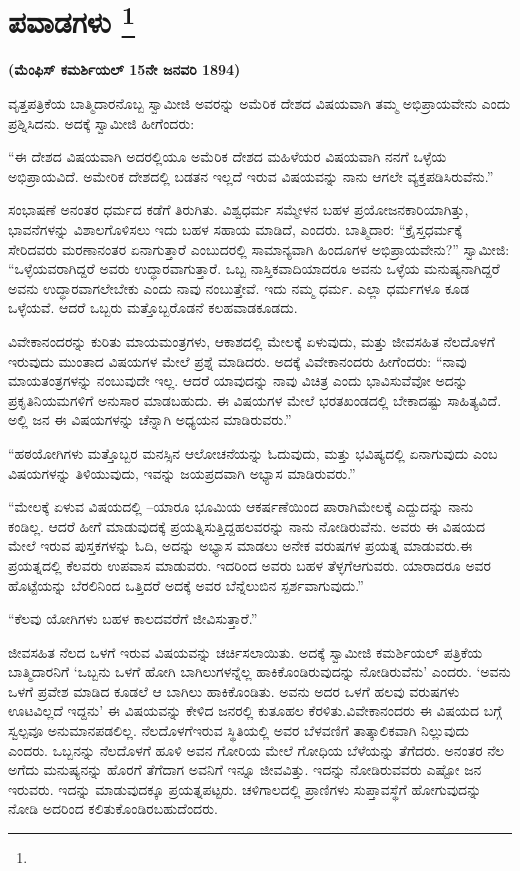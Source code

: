 
\chapter[ಪವಾಡಗಳು ]{ಪವಾಡಗಳು \protect\footnote{}}

\centerline{\textbf{(ಮೆಂಫಿಸ್​ ಕಮರ್ಶಿಯಲ್​ 15ನೇ ಜನವರಿ 1894)}}

ವೃತ್ತಪತ್ರಿಕೆಯ ಬಾತ್ಮಿದಾರನೊಬ್ಬ ಸ್ವಾಮೀಜಿ ಅವರನ್ನು ಅಮೆರಿಕ ದೇಶದ ವಿಷಯವಾಗಿ ತಮ್ಮ ಅಭಿಪ್ರಾಯವೇನು ಎಂದು ಪ್ರಶ್ನಿಸಿದನು. ಅದಕ್ಕೆ ಸ್ವಾಮೀಜಿ ಹೀಗೆಂದರು:

“ಈ ದೇಶದ ವಿಷಯವಾಗಿ ಅದರಲ್ಲಿಯೂ ಅಮೆರಿಕ ದೇಶದ ಮಹಿಳೆಯರ ವಿಷಯವಾಗಿ ನನಗೆ ಒಳ್ಳೆಯ ಅಭಿಪ್ರಾಯವಿದೆ. ಅಮೇರಿಕ ದೇಶದಲ್ಲಿ ಬಡತನ ಇಲ್ಲದೆ ಇರುವ ವಿಷಯವನ್ನು ನಾನು ಆಗಲೇ ವ್ಯಕ್ತಪಡಿಸಿರುವೆನು.”

ಸಂಭಾಷಣೆ ಅನಂತರ ಧರ್ಮದ ಕಡೆಗೆ ತಿರುಗಿತು. ವಿಶ್ವಧರ್ಮ ಸಮ್ಮೇಳನ ಬಹಳ ಪ್ರಯೋಜನಕಾರಿಯಾಗಿತ್ತು, ಭಾವನೆಗಳನ್ನು ವಿಶಾಲಗೊಳಿಸಲು ಇದು ಬಹಳ ಸಹಾಯ ಮಾಡಿದೆ, ಎಂದರು. ಬಾತ್ಮಿದಾರ: “ಕ್ರೈಸ್ತಧರ್ಮಕ್ಕೆ ಸೇರಿದವರು ಮರಣಾನಂತರ ಏನಾಗುತ್ತಾರೆ ಎಂಬುದರಲ್ಲಿ ಸಾಮಾನ್ಯವಾಗಿ ಹಿಂದೂಗಳ ಅಭಿಪ್ರಾಯವೇನು?” ಸ್ವಾಮೀಜಿ: “ಒಳ್ಳೆಯವರಾಗಿದ್ದರೆ ಅವರು ಉದ್ಧಾರವಾಗುತ್ತಾರೆ. ಒಬ್ಬ ನಾಸ್ತಿಕವಾದಿಯಾದರೂ ಅವನು ಒಳ್ಳೆಯ ಮನುಷ್ಯನಾಗಿದ್ದರೆ ಅವನು ಉದ್ಧಾರವಾಗಲೇಬೇಕು ಎಂದು ನಾವು ನಂಬುತ್ತೇವೆ. ಇದು ನಮ್ಮ ಧರ್ಮ. ಎಲ್ಲಾ ಧರ್ಮಗಳೂ ಕೂಡ ಒಳ್ಳೆಯವೆ. ಆದರೆ ಒಬ್ಬರು ಮತ್ತೊಬ್ಬರೊಡನೆ ಕಲಹವಾಡಕೂಡದು.

ವಿವೇಕಾನಂದರನ್ನು ಕುರಿತು ಮಾಯಮಂತ್ರಗಳು, ಆಕಾಶದಲ್ಲಿ ಮೇಲಕ್ಕೆ ಏಳುವುದು, ಮತ್ತು ಜೀವಸಹಿತ ನೆಲದೊಳಗೆ ಇರುವುದು ಮುಂತಾದ ವಿಷಯಗಳ ಮೇಲೆ ಪ್ರಶ್ನೆ ಮಾಡಿದರು. ಅದಕ್ಕೆ ವಿವೇಕಾನಂದರು ಹೀಗೆಂದರು: “ನಾವು ಮಾಯತಂತ್ರಗಳನ್ನು ನಂಬುವುದೇ ಇಲ್ಲ. ಆದರೆ ಯಾವುದನ್ನು ನಾವು ವಿಚಿತ್ರ ಎಂದು ಭಾವಿಸುವೆವೋ ಅದನ್ನು ಪ್ರಕೃತಿನಿಯಮಗಳಿಗೆ ಅನುಸಾರ ಮಾಡಬಹುದು. ಈ ವಿಷಯಗಳ ಮೇಲೆ ಭರತಖಂಡದಲ್ಲಿ ಬೇಕಾದಷ್ಟು ಸಾಹಿತ್ಯವಿದೆ. ಅಲ್ಲಿ ಜನ ಈ ವಿಷಯಗಳನ್ನು ಚೆನ್ನಾಗಿ ಅಧ್ಯಯನ ಮಾಡಿರುವರು.”

“ಹಠಯೋಗಿಗಳು ಮತ್ತೊಬ್ಬರ ಮನಸ್ಸಿನ ಆಲೋಚನೆಯನ್ನು ಓದುವುದು, ಮತ್ತು ಭವಿಷ್ಯದಲ್ಲಿ ಏನಾಗುವುದು ಎಂಬ ವಿಷಯಗಳನ್ನು ತಿಳಿಯುವುದು, ಇವನ್ನು ಜಯಪ್ರದವಾಗಿ ಅಭ್ಯಾಸ ಮಾಡಿರುವರು.”

“ಮೇಲಕ್ಕೆ ಏಳುವ ವಿಷಯದಲ್ಲಿ –ಯಾರೂ ಭೂಮಿಯ ಆಕರ್ಷಣೆಯಿಂದ ಪಾರಾಗಿ\break ಮೇಲಕ್ಕೆ ಎದ್ದುದನ್ನು ನಾನು ಕಂಡಿಲ್ಲ. ಆದರೆ ಹೀಗೆ ಮಾಡುವುದಕ್ಕೆ ಪ್ರಯತ್ನಿಸುತ್ತಿದ್ದ\break ಹಲವರನ್ನು ನಾನು ನೋಡಿರುವೆನು. ಅವರು ಈ ವಿಷಯದ ಮೇಲೆ ಇರುವ ಪುಸ್ತಕಗಳನ್ನು ಓದಿ, ಅದನ್ನು ಅಭ್ಯಾಸ ಮಾಡಲು ಅನೇಕ ವರುಷಗಳ ಪ್ರಯತ್ನ ಮಾಡುವರು.\break ಈ ಪ್ರಯತ್ನದಲ್ಲಿ ಕೆಲವರು ಉಪವಾಸ ಮಾಡುವರು. ಇದರಿಂದ ಅವರು ಬಹಳ ತೆಳ್ಳಗೆ\break ಆಗುವರು. ಯಾರಾದರೂ ಅವರ ಹೊಟ್ಟೆಯನ್ನು ಬೆರಲಿನಿಂದ ಒತ್ತಿದರೆ ಅದಕ್ಕೆ ಅವರ ಬೆನ್ನೆಲುಬಿನ ಸ್ಪರ್ಶವಾಗುವುದು.”

“ಕೆಲವು ಯೋಗಿಗಳು ಬಹಳ ಕಾಲದವರೆಗೆ ಜೀವಿಸುತ್ತಾರೆ.”

ಜೀವಸಹಿತ ನೆಲದ ಒಳಗೆ ಇರುವ ವಿಷಯವನ್ನು ಚರ್ಚಿಸಲಾಯಿತು. ಅದಕ್ಕೆ ಸ್ವಾಮೀಜಿ ಕಮರ್ಶಿಯಲ್​ ಪತ್ರಿಕೆಯ ಬಾತ್ಮಿದಾರನಿಗೆ ‘ಒಬ್ಬನು ಒಳಗೆ ಹೋಗಿ ಬಾಗಿಲುಗಳನ್ನೆಲ್ಲ ಹಾಕಿಕೊಂಡಿರುವುದನ್ನು ನೋಡಿರುವೆನು’ ಎಂದರು. ‘ಅವನು ಒಳಗೆ ಪ್ರವೇಶ ಮಾಡಿದ ಕೂಡಲೆ ಆ ಬಾಗಿಲು ಹಾಕಿಕೊಂಡಿತು. ಅವನು ಅದರ ಒಳಗೆ ಹಲವು ವರುಷಗಳು ಊಟವಿಲ್ಲದೆ ಇದ್ದನು’ ಈ ವಿಷಯವನ್ನು ಕೇಳಿದ ಜನರಲ್ಲಿ ಕುತೂಹಲ ಕೆರಳಿತು.\break ವಿವೇಕಾನಂದರು ಈ ವಿಷಯದ ಬಗ್ಗೆ ಸ್ವಲ್ಪವೂ ಅನುಮಾನಪಡಲಿಲ್ಲ. ನೆಲದೊಳಗೆ\break ಇರುವ ಸ್ಥಿತಿಯಲ್ಲಿ ಅವರ ಬೆಳವಣಿಗೆ ತಾತ್ಕಾಲಿಕವಾಗಿ ನಿಲ್ಲುವುದು ಎಂದರು. ಒಬ್ಬನನ್ನು ನೆಲದೊಳಗೆ ಹೂಳಿ ಅವನ ಗೋರಿಯ ಮೇಲೆ ಗೋಧಿಯ ಬೆಳೆಯನ್ನು ತೆಗೆದರು. ಅನಂತರ ನೆಲ ಅಗೆದು ಮನುಷ್ಯನನ್ನು ಹೊರಗೆ ತೆಗೆದಾಗ ಅವನಿಗೆ ಇನ್ನೂ ಜೀವವಿತ್ತು. ಇದನ್ನು ನೋಡಿರುವವರು ಎಷ್ಟೋ ಜನ ಇರುವರು. ಇದನ್ನು ಮಾಡುವುದಕ್ಕೂ ಪ್ರಯತ್ನಪಟ್ಟರು. ಚಳಿಗಾಲದಲ್ಲಿ ಪ್ರಾಣಿಗಳು ಸುಪ್ತಾವಸ್ಥೆಗೆ ಹೋಗುವುದನ್ನು ನೋಡಿ ಅದರಿಂದ ಕಲಿತುಕೊಂಡಿರಬಹುದೆಂದರು.

